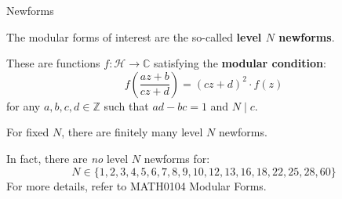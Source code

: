 \documentclass[10pt]{beamer}
\theoremstyle{definition}
\begin{document}
\begin{frame}[t]{Newforms}

The modular forms of interest are the so-called \textbf{level $ N $ newforms}.

\vspace{0.5cm} These are functions $ f : \mathcal{H} \to \mathbb{C} $ satisfying the \textbf{modular condition}:
$$ f\left(\dfrac{az + b}{cz + d}\right) = (cz + d)^2 \cdot f(z) $$
for any $ a, b, c, d \in \mathbb{Z} $ such that $ ad - bc = 1 $ and $ N \mid c $.

\vspace{0.5cm}

\begin{theorem}
For fixed $ N $, there are finitely many level $ N $ newforms.
\end{theorem}

\vspace{0.5cm} In fact, there are \emph{no} level $ N $ newforms for:
$$ N \in \{1, 2, 3, 4, 5, 6, 7, 8, 9, 10, 12, 13, 16, 18, 22, 25, 28, 60\} $$
For more details, refer to MATH0104 Modular Forms.

\end{frame}
\end{document}
